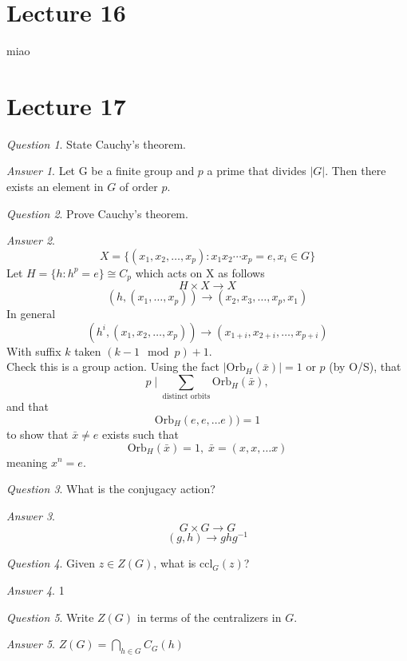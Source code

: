 \documentclass[]{article}
\theoremstyle{remark}
\theoremstyle{qnstyle}
\newtheorem{question}{Question}
\theoremstyle{answerstyle}
\newtheorem*{answer}{Answer}
\begin{document}
\section* {Lecture 16}
miao
\section* {Lecture 17}
{
    \begin{question}
        State Cauchy's theorem.
    \end{question}
    \begin{answer}
        Let G be a finite group and $p$ a prime that divides $|G|$. Then there 
        exists an element in $G$ of order $p$.
    \end{answer}  
}
{
    \begin{question}
        Prove Cauchy's theorem.
    \end{question}
    \begin{answer}
        $$X = \{ (x_1, x_2, \ldots, x_p): x_1 x_2 \cdots x_p = e, x_i \in G \}$$
        Let $H = \lbrace h: h^p = e \rbrace \cong C_p$
        which acts on X as follows
        $$H \times X \to X$$
        $$(h, (x_1,\ldots , x_p)) \to (x_2, x_3, \ldots, x_p, x_1)$$
        In general $$(h^i, (x_1,x_2, \ldots, x_p)) \to (x_{1+i}, x_{2+i}, \ldots, x_{p+i})$$
        With suffix $k$ taken $(k-1 \mod p) +1$. \\
        Check this is a group action. Using the fact $|\text{Orb}_H(\bar{x})| = 1$ or $p$ (by O/S),
        that $$p \; \Big\vert\; \sum_{\text{distinct orbits}}{\text{Orb}_H}(\bar{x}),$$ and that 
        $$\text{Orb}_H(e,e, \ldots e)) = 1$$ to show that 
        $\bar{x} \neq e$ exists such that $$\text{Orb}_H(\bar{x}) = 1, \; \bar{x} = (x, x, \ldots x)$$
        meaning $x^n = e$.
    \end{answer}  
}
{
    \begin{question}
        What is the conjugacy action?
    \end{question}
    \begin{answer}
        $$G \times G \to G$$
        $$(g, h) \to ghg^{-1}$$
    \end{answer}
}
{
    \begin{question}
        Given $z \in Z(G)$, what is $\text{ccl}_G(z)$?
    \end{question}
    \begin{answer}
        1
    \end{answer}
}
{
    \begin{question}
        Write $Z(G)$ in terms of the centralizers in $G$.
    \end{question}
    \begin{answer}
        $Z(G) = \bigcap_{h \in G} C_G(h)$
    \end{answer}
}
\end{document}

